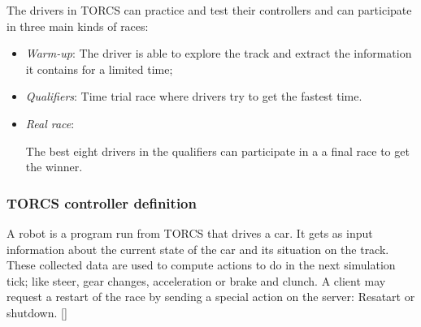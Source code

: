 \documentclass{llncs}
\begin{document}
The drivers in TORCS can practice and test their controllers and can participate in three main kinds of races:
\begin{itemize}
	\item \emph{Warm-up}: 
	The driver is able to explore the track and extract the information it contains for a limited time; 
	\item \emph{Qualifiers}: 
	Time trial race where drivers try to get the fastest time.
	\item \emph{Real race}: 
	
	The best eight drivers in the qualifiers can participate in a a final race to get the winner.			
\end{itemize}

\subsubsection{TORCS controller definition}	
A robot is a program run from TORCS that drives a car. It gets as input information about the current state of the car and its situation on the track. These collected data are used to compute actions to do in the next simulation tick; like steer, gear changes, acceleration or brake and clunch. A client may request a restart of the race by sending a special action on the server: Resatart or shutdown.
[\cite{manual}]
\end{document}

